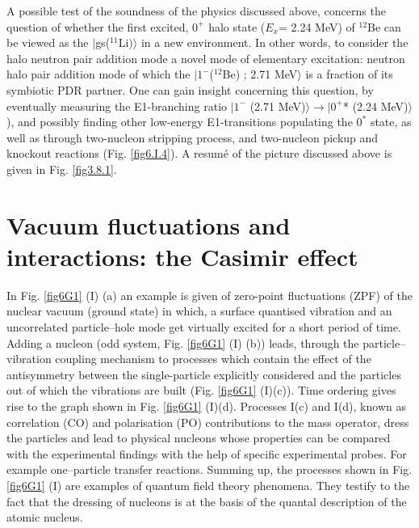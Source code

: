 \begin{subappendices}
A  possible test of the soundness of the physics  discussed above, concerns the question of whether the first excited, 
$0^+$ halo state ($E_x$= 2.24 MeV) of $^{12}$Be can be viewed as the $|$gs($^{11}$Li$)\rangle$ in a new environment. In other words, 
to consider the halo neutron pair addition mode
 a novel mode of  elementary excitation: neutron halo pair  addition mode of which the $|1^- $($^{12}$Be) ; 2.71 MeV$\rangle $ is 
 a fraction of  its symbiotic  PDR partner. One can gain insight concerning this question, by 
 eventually measuring the E1-branching ratio $|1^-$ (2.71 MeV)$\rangle  \to |0^+$* (2.24 MeV)$\rangle$ ), and possibly 
 finding other low-energy E1-transitions populating the $0^*$ state, as well as through  two-nucleon stripping process,
 and two-nucleon pickup and knockout reactions (Fig. \ref{fig6.I.4}).
 A resum\'e of the picture discussed above is given   in Fig. \ref{fig3.8.1}.
 \FloatBarrier
 \section[Vacuum fluctuations: the Casimir effect]{Vacuum fluctuations and interactions: the Casimir effect}\label{C7AppG}
In Fig. \ref{fig6G1} (I) (a) an example is given of  zero-point fluctuations (ZPF) of the nuclear vacuum (ground state) in which, a surface quantised vibration and an uncorrelated particle--hole mode get virtually excited for a short period of time.  Adding 
a nucleon (odd system, Fig. \ref{fig6G1} (I) (b)) leads, through the particle--vibration coupling mechanism to processes which contain the effect of the antisymmetry between the single-particle explicitly considered and the particles out of which  the vibrations are built  (Fig. \ref{fig6G1} (I)(c)). Time ordering 
gives rise to the graph shown in Fig. \ref{fig6G1} (I)(d). Processes I(c) and I(d),  known as correlation (CO) and polarisation (PO) contributions to the mass
operator,  dress the particles and lead to physical nucleons  whose properties can be compared with the experimental findings with the help of specific experimental probes. For example one--particle transfer reactions. Summing up, 
the processes shown in Fig. \ref{fig6G1} (I) are examples of quantum field theory phenomena. They testify  to the fact that the dressing of nucleons is at the basis of the quantal description of the atomic nucleus. 


\end{subappendices}
